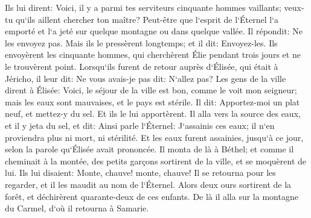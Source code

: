 \verse Ils lui dirent: Voici, il y a parmi tes serviteurs cinquante hommes vaillants; veux-tu qu`ils aillent chercher ton maître? Peut-être que l`esprit de l`Éternel l`a emporté et l`a jeté sur quelque montagne ou dans quelque vallée. Il répondit: Ne les envoyez pas. 
\verse Mais ils le pressèrent longtemps; et il dit: Envoyez-les. Ils envoyèrent les cinquante hommes, qui cherchèrent Élie pendant trois jours et ne le trouvèrent point. 
\verse Lorsqu`ils furent de retour auprès d`Élisée, qui était à Jéricho, il leur dit: Ne vous avais-je pas dit: N`allez pas? 
\verse Les gens de la ville dirent à Élisée: Voici, le séjour de la ville est bon, comme le voit mon seigneur; mais les eaux sont mauvaises, et le pays est stérile. 
\verse Il dit: Apportez-moi un plat neuf, et mettez-y du sel. Et ils le lui apportèrent. 
\verse Il alla vers la source des eaux, et il y jeta du sel, et dit: Ainsi parle l`Éternel: J`assainis ces eaux; il n`en proviendra plus ni mort, ni stérilité. 
\verse Et les eaux furent assainies, jusqu`à ce jour, selon la parole qu`Élisée avait prononcée. 
\verse Il monta de là à Béthel; et comme il cheminait à la montée, des petits garçons sortirent de la ville, et se moquèrent de lui. Ils lui disaient: Monte, chauve! monte, chauve! 
\verse Il se retourna pour les regarder, et il les maudit au nom de l`Éternel. Alors deux ours sortirent de la forêt, et déchirèrent quarante-deux de ces enfants. 
\verse De là il alla sur la montagne du Carmel, d`où il retourna à Samarie. 

\chapter{}


